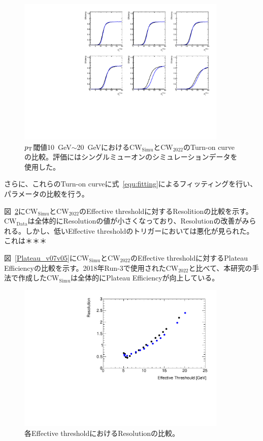 \begin{figure}[htb]
  \centering
  \includegraphics[clip, width=10cm]{fig/5/v05v07_10_15.pdf}
  \caption{$p_{\rm{T}}$閾値10~GeV$\sim$20~GeVにおける$\mathrm{CW_{Simu}}$と$\mathrm{CW_{2022}}$のTurn-on curveの比較。評価にはシングルミューオンのシミュレーションデータを使用した。}
  \label{fig:v05v07_12_20_Simu}
\end{figure}

さらに、これらのTurn-on curveに式~\eqref{equ:fitting}によるフィッティングを行い、パラメータの比較を行う。

図~\ref{fig:Resolution_v07v05}に$\mathrm{CW_{Simu}}$と$\mathrm{CW_{2022}}$のEffective thresholdに対するResolitionの比較を示す。
$\mathrm{CW_{Data}}$は全体的にResolutionの値が小さくなっており、Resolutionの改善がみられる。しかし、低いEffective thresholdのトリガーにおいては悪化が見られた。
これは＊＊＊

図~\ref{Plateau_v07v05}に$\mathrm{CW_{Simu}}$と$\mathrm{CW_{2022}}$のEffective thresholdに対するPlateau Efficiencyの比較を示す。2018年Run-3で使用された$\mathrm{CW_{2022}}$と比べて、本研究の手法で作成した$\mathrm{CW_{Simu}}$は全体的にPlateau Efficiencyが向上している。
\begin{figure}[htb]
  \centering
  \includegraphics[clip, width=10cm]{fig/4/v05vsv07_Resolution.pdf}
  \caption{各Effective thresholdにおけるResolutionの比較。}
  \label{fig:Resolution_v07v05}
\end{figure}

